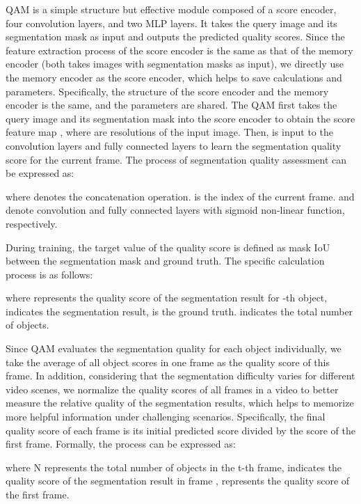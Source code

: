 \documentclass[runningheads]{llncs}
\begin{document}
    QAM is a simple structure but effective module composed of a score encoder, four convolution layers, and two MLP layers. 
    It takes the query image  and its segmentation mask  as input and outputs the predicted quality scores.
    Since the feature extraction process of the score encoder  is the same as that of the memory encoder  (both takes images with segmentation masks as input), we directly use the memory encoder as the score encoder, which helps to save calculations and parameters. 
    Specifically, the structure of the score encoder  and the memory encoder  is the same, and the parameters are shared. 
The QAM first takes the query image  and its segmentation mask  into the score encoder to obtain the score feature map ,
    where  are resolutions of the input image. 
    Then,  is input to the  convolution layers and fully connected layers to learn the segmentation quality score  for the current frame. The process of segmentation quality assessment can be expressed as:
    \vspace{-7pt}
    
where  denotes the concatenation operation. 
     is the index of the current frame.
      and  denote convolution and fully connected layers with sigmoid non-linear function, respectively. 
    
    During training, the target value of the quality score is defined as mask IoU between the segmentation mask and ground truth. 
    The specific calculation process is as follows:
    
    where  represents the quality score of the segmentation result for -th object,  indicates the segmentation result,  is the ground truth.  indicates the total number of objects.
    
    
    Since QAM evaluates the segmentation quality for each object individually, we take the average of all object scores in one frame as the quality score of this frame. In addition, considering that the segmentation difficulty varies for different video scenes, we normalize the quality scores of all frames in a video to better measure the relative quality of the segmentation results, which helps to memorize more helpful information under challenging scenarios. Specifically, the final quality score of each frame is its initial predicted score divided by the score of the first frame. Formally, the process can be expressed as:

    
    where N represents the total number of objects in the t-th frame,  indicates the quality score of the segmentation result in frame ,  represents the quality score of the first frame.
\end{document}
